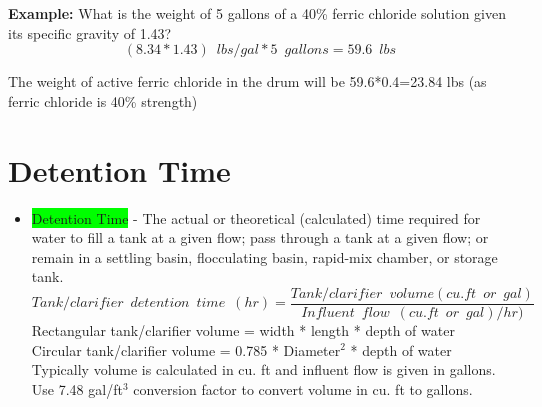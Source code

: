 \textbf{Example:} What is the weight of 5 gallons of a 40\% ferric chloride solution given its specific gravity of 1.43?
$$(8.34 * 1.43) \enspace lbs/gal*5 \enspace gallons = \boxed{59.6 \enspace lbs}$$

The weight of active ferric chloride in the drum will be 59.6*0.4=23.84 lbs (as ferric chloride is 40\% strength)

\section{Detention Time}
\begin{itemize}
\item \colorbox{lime}{Detention Time} - The actual or theoretical (calculated) time required for water to fill a tank at a given flow; pass through a tank at a given flow; or remain in a settling basin, flocculating basin, rapid-mix chamber, or storage tank.\\
$$Tank/clarifier \enspace detention \enspace time \enspace (hr) = 	\dfrac{ Tank/clarifier \enspace volume (cu.ft \enspace or \enspace gal)}{Influent \enspace flow \enspace (cu.ft \enspace or \enspace gal)/hr)}$$
Rectangular tank/clarifier volume = width * length * depth of water\\
Circular tank/clarifier volume = 0.785 * Diameter$^2$ * depth of water\\
Typically volume is calculated in cu. ft and influent flow is given in gallons.  Use 7.48 gal/ft$^3$ conversion factor to convert volume in cu. ft to gallons.\\
\end{itemize}


